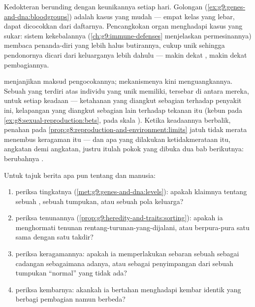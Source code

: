 \begin{example}\label{ex:g9:unique-individuals:medicine}
Kedokteran berunding dengan keunikannya setiap hari.
Golongan  (\cref{ex:g9:genes-and-dna:bloodgroups})
adalah kasus yang mudah --- empat kelas yang lebar, dapat
dicocokkan dari daftarnya. Pencangkokan organ menghadapi
kasus yang sukar: sistem kekebalannya
(\cref{ch:g9:immune-defenses} menjelaskan permesinannya)
membaca penanda-diri yang lebih halus butirannya, cukup unik
sehingga pendonornya dicari dari keluarganya lebih dahulu
--- makin dekat , makin dekat pembagiannya.
\end{example}

\begin{proposition}\label{prop:g9:unique-individuals:reserve}
 menjanjikan maksud
pengocokannya; mekanismenya kini menguangkannya. Sebuah
 yang terdiri atas individu yang unik memiliki,
tersebar di antara mereka,  untuk setiap keadaan ---
ketahanan yang diangkut sebagian terhadap penyakit ini,
kelapangan yang diangkut sebagian lain terhadap tekanan itu
(kebun  pada \cref{ex:g8:sexual-reproduction:bets}, pada
skala ). Ketika keadaannya berbalik, penahan pada
\cref{prop:g8:reproduction-and-environment:limits} jatuh
tidak merata menembus keragaman itu --- dan apa yang
dilakukan ketidakmerataan itu, angkatan demi angkatan,
justru itulah pokok yang dibuka dua bab berikutnya:
berubahnya .
\end{proposition}
\admitted

\begin{method}\label{met:g9:unique-individuals:claims}
Untuk tajuk berita apa pun tentang  dan manusia:
\begin{enumerate}
  \item periksa tingkatnya
        (\cref{met:g9:genes-and-dna:levels}): apakah
        klaimnya tentang sebuah , sebuah tumpukan, atau
        sebuah pola keluarga?
  \item periksa tenunannya
        (\cref{prop:g9:heredity-and-traits:sorting}): apakah
        ia menghormati tenunan
        rentang-turunan-yang-dijalani, atau berpura-pura
        satu  sama dengan satu takdir?
  \item periksa keragamannya: apakah ia memperlakukan
        sebaran sebuah  sebagai cadangan sebagaimana
        adanya, atau sebagai penyimpangan dari sebuah
        tumpukan ``normal'' yang tidak ada?
  \item periksa kembarnya: akankah ia bertahan menghadapi
        kembar identik yang berbagi pembagian namun berbeda?
\end{enumerate}
\end{method}

